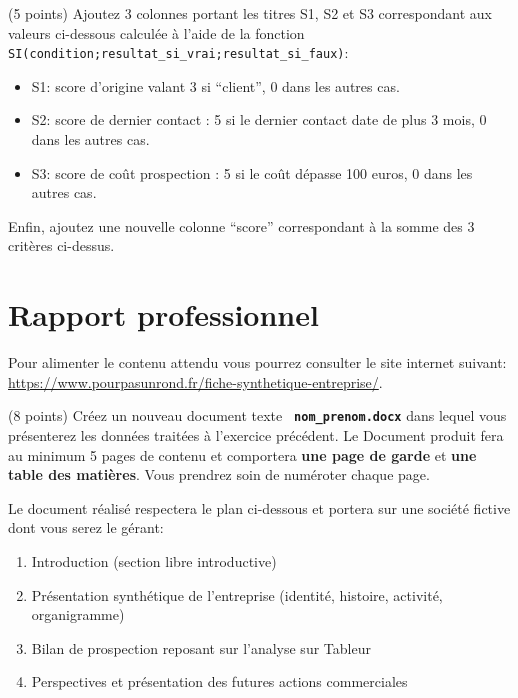 \documentclass[a4paper,8pt]{article}
\begin{document}
\exost (5 points) Ajoutez 3 colonnes portant les titres S1, S2 et S3 correspondant
aux valeurs ci-dessous calcul\'ee \`a l'aide de la fonction \verb?SI(condition;resultat_si_vrai;resultat_si_faux)?:
\begin{itemize}
 \item S1: score d'origine valant 3 si ``client'', 0 dans les autres cas.
 \item S2: score de dernier contact : 5 si le dernier contact date de plus 3 mois, 0 dans les autres cas.
 \item S3: score de co\^ut prospection : 5 si le co\^ut d\'epasse 100 euros, 0 dans les autres cas.
\end{itemize}
Enfin, ajoutez une nouvelle colonne ``score'' correspondant \`a la somme des 3 crit\`eres ci-dessus.
\vspace{-0.3cm}
\section{Rapport professionnel}
Pour alimenter le contenu attendu vous pourrez consulter le site internet suivant: \url{https://www.pourpasunrond.fr/fiche-synthetique-entreprise/}.

\exost (8 points) Cr\'eez un nouveau document texte {\bf \verb? nom_prenom.docx?} dans lequel vous pr\'esenterez les donn\'ees trait\'ees \`a l'exercice pr\'ec\'edent.
Le Document produit fera au minimum 5 pages de contenu et comportera {\bf une page de garde} et {\bf une table des mati\`eres}.
Vous prendrez soin de num\'eroter chaque page.

Le document r\'ealis\'e respectera le plan ci-dessous et portera sur une soci\'et\'e fictive dont vous serez le g\'erant:
%
\begin{enumerate}
 \item Introduction (section libre introductive)
 \item Pr\'esentation synth\'etique de l'entreprise (identit\'e, histoire, activit\'e, organigramme)
 \item Bilan de prospection reposant sur l'analyse sur Tableur
 \item Perspectives et pr\'esentation des futures actions commerciales
\end{enumerate}


% 
% 
% 
% 
\end{document}

